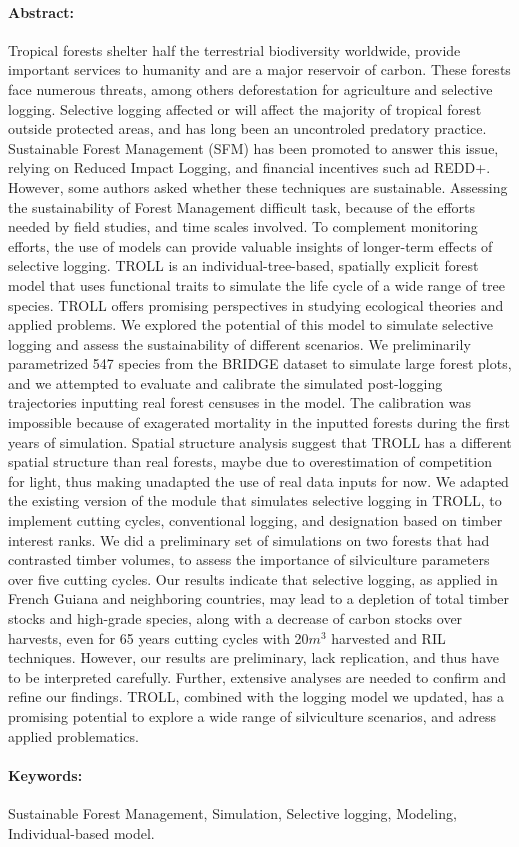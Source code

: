\documentclass[12pt,]{article}
\theoremstyle{definition}
\theoremstyle{definition}
\theoremstyle{definition}
\theoremstyle{remark}
\begin{document}
{  \paragraph{Abstract:}
  Tropical forests shelter half the terrestrial biodiversity worldwide, provide important services to humanity and are a major reservoir of carbon. These forests face numerous threats, among others deforestation for agriculture and selective logging. Selective logging affected or will affect the majority of tropical forest outside protected areas, and has long been an uncontroled predatory practice. Sustainable Forest Management (SFM) has been promoted to answer this issue, relying on Reduced Impact Logging, and financial incentives such ad REDD+. However, some authors asked whether these techniques are sustainable. Assessing the sustainability of Forest Management difficult task, because of the efforts needed by field studies, and time scales involved. To complement monitoring efforts, the use of models can provide valuable insights of longer-term effects of selective logging. TROLL is an individual-tree-based, spatially explicit forest model that uses functional traits to simulate the life cycle of a wide range of tree species. TROLL offers promising perspectives in studying ecological theories and applied problems. We explored the potential of this model to simulate selective logging and assess the sustainability of different scenarios. We preliminarily parametrized 547 species from the BRIDGE dataset to simulate large forest plots, and we attempted to evaluate and calibrate the simulated post-logging trajectories inputting real forest censuses in the model. The calibration was impossible because of exagerated mortality in the inputted forests during the first years of simulation. Spatial structure analysis suggest that TROLL has a different spatial structure than real forests, maybe due to overestimation of competition for light, thus making unadapted the use of real data inputs for now. We adapted the existing version of the module that simulates selective logging in TROLL, to implement cutting cycles, conventional logging, and designation based on timber interest ranks. We did a preliminary set of simulations on two forests that had contrasted timber volumes, to assess the importance of silviculture parameters over five cutting cycles. Our results indicate that selective logging, as applied in French Guiana and neighboring countries, may lead to a depletion of total timber stocks and high-grade species, along with a decrease of carbon stocks over harvests, even for 65 years cutting cycles with 20$m^3$ harvested and RIL techniques. However, our results are preliminary, lack replication, and thus have to be interpreted carefully. Further, extensive analyses are needed to confirm and refine our findings. TROLL, combined with the logging model we updated, has a promising potential to explore a wide range of silviculture scenarios, and adress applied problematics.
  \paragraph{Keywords:}Sustainable Forest Management, Simulation, Selective logging, Modeling, Individual-based model.
  }
  
\end{document}
